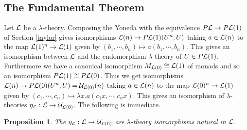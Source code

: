 \documentclass[12pt, amstex, amssymb]{article}
\newtheorem{proposition}[theorem]{Proposition}
\newcommand{\mcat}{\cal}
\begin{document}
\subsection{The Fundamental Theorem}\label{fundsec}

Let ${\mcat L}$ be a $\lambda$-theory. Composing the Yoneda with
the equivalence $P{\mcat L} \to P{\mcat L}(1)$ of Section \ref{taylor}
gives isomorphisms
${\mcat L}(n) \to P{\mcat L}(1)(U^n,U)$ taking
$a \in {\mcat L}(n)$ to the map
${\mcat L}(1)^n \to {\mcat L}(1)$ given by 
$(b_1, \cdots , b_n) \mapsto a(b_1, \cdots , b_n)$.
This gives an isomorphism between $\mcat L$ and the
endomorphism $\lambda$-theory of $U \in P{\mcat L}(1)$.
Furthermore we have a canonical isomorphism
$M_{{\mcat L}(0)} \cong {\mcat L}(1)$ of monads and so
an isomorphism $P{\mcat L}(1) \cong P{\mcat L}(0)$.
Thus we get isomorphisms
${\mcat L}(n) \to P{\mcat L}(0)(U^n,U) = {\mcat U}_{{\mcat L}(0)}(n)$
taking
$a \in {\mcat L}(n)$ to the map
${\mcat L}(0)^n \to {\mcat L}(1)$ given by 
$(c_1, \cdots , c_n) \mapsto \lambda x. a(c_1x, \cdots , c_nx)$.
This gives an isomorphism of $\lambda$-theories
$\eta_{\mcat L} :{\mcat L} \to {\mcat U}_{{\mcat L}(0)}$. The following
is immediate.
\begin{proposition}\label{eta}
The $\eta_{\mcat L} :{\mcat L} \to {\mcat U}_{{\mcat L}(0)}$
are $\lambda$-theory isomorphisms natural in 
$\mcat L$.
\end{proposition}
\end{document}
